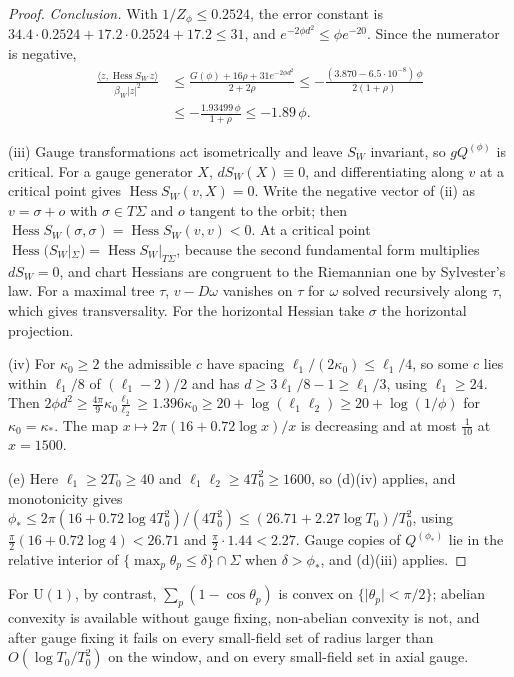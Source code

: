 \documentclass[11pt,a4paper]{amsart}
\theoremstyle{definition}
\theoremstyle{remark}
\numberwithin{equation}{section}
\DeclareMathOperator{\Hess}{Hess}    %
\newcommand{\ip}[2]{\langle #1,#2\rangle}  %
\newcommand{\abs}[1]{\lvert #1\rvert}      %
\newcommand{\U}{\mathrm{U}}                %
\newcommand{\betaW}{\beta_{W}}             %
\begin{document}
\begin{proof}
\emph{Conclusion.} With $1/Z_\phi\le0.2524$, the error constant is $34.4\cdot0.2524+17.2\cdot0.2524+17.2\le31$, and $e^{-2\phi d^2}\le\phi e^{-20}$. Since the numerator is negative,
\[
\begin{aligned}
\frac{\ip z{\Hess S_W\,z}}{\betaW\abs z^2}&\le\frac{G(\phi)+16\rho+31e^{-2\phi d^2}}{2+2\rho}\le-\frac{(3.870-6.5\cdot10^{-8})\,\phi}{2(1+\rho)}\\
&\le-\frac{1.93499\,\phi}{1+\rho}\le-1.89\,\phi .
\end{aligned}
\]

(iii) Gauge transformations act isometrically and leave $S_W$ invariant, so $gQ^{(\phi)}$ is critical. For a gauge generator $X$, $dS_W(X)\equiv0$, and differentiating along $v$ at a critical point gives $\Hess S_W(v,X)=0$. Write the negative vector of (ii) as $v=\sigma+o$ with $\sigma\in T\Sigma$ and $o$ tangent to the orbit; then $\Hess S_W(\sigma,\sigma)=\Hess S_W(v,v)<0$. At a critical point $\Hess(S_W|_\Sigma)=\Hess S_W|_{T\Sigma}$, because the second fundamental form multiplies $dS_W=0$, and chart Hessians are congruent to the Riemannian one by Sylvester's law. For a maximal tree $\tau$, $v-D\omega$ vanishes on $\tau$ for $\omega$ solved recursively along $\tau$, which gives transversality. For the horizontal Hessian take $\sigma$ the horizontal projection.

(iv) For $\kappa_0\ge2$ the admissible $c$ have spacing $\ell_1/(2\kappa_0)\le\ell_1/4$, so some $c$ lies within $\ell_1/8$ of $(\ell_1-2)/2$ and has $d\ge3\ell_1/8-1\ge\ell_1/3$, using $\ell_1\ge24$. Then $2\phi d^2\ge\frac{4\pi}9\kappa_0\frac{\ell_1}{\ell_2}\ge1.396\kappa_0\ge20+\log(\ell_1\ell_2)\ge20+\log(1/\phi)$ for $\kappa_0=\kappa_*$. The map $x\mapsto2\pi(16+0.72\log x)/x$ is decreasing and at most $\frac1{10}$ at $x=1500$.

(e) Here $\ell_1\ge2T_0\ge40$ and $\ell_1\ell_2\ge4T_0^2\ge1600$, so (d)(iv) applies, and monotonicity gives $\phi_*\le2\pi(16+0.72\log4T_0^2)/(4T_0^2)\le(26.71+2.27\log T_0)/T_0^2$, using $\frac\pi2(16+0.72\log4)<26.71$ and $\frac\pi2\cdot1.44<2.27$. Gauge copies of $Q^{(\phi_*)}$ lie in the relative interior of $\{\max_p\theta_p\le\delta\}\cap\Sigma$ when $\delta>\phi_*$, and (d)(iii) applies.
\end{proof}

For $\U(1)$, by contrast, $\sum_p(1-\cos\theta_p)$ is convex on $\{\abs{\theta_p}<\pi/2\}$; abelian convexity is available without gauge fixing, non-abelian convexity is not, and after gauge fixing it fails on every small-field set of radius larger than $O(\log T_0/T_0^2)$ on the window, and on every small-field set in axial gauge.
\end{document}
